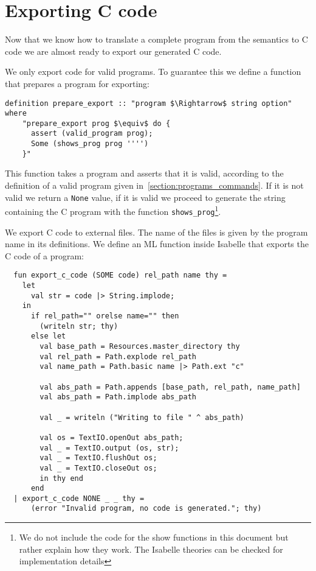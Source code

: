 \section{Exporting C code}\label{section:exporting_c_code}

Now that we know how to translate a complete program from the semantics to C code we are almost ready to export our generated C code.

We only export code for valid programs.
To guarantee this we define a function that prepares a program for exporting:

\begin{lstlisting}[mathescape=true]
  definition prepare_export :: "program $\Rightarrow$ string option" where
    "prepare_export prog $\equiv$ do {
      assert (valid_program prog);
      Some (shows_prog prog '''')
    }"
\end{lstlisting}


This function takes a program and asserts that it is valid, according to the definition of a valid program given in~\ref{section:programs_commands}.
If it is not valid we return a \verb|None| value, if it is valid we proceed to generate the string containing the C program with the function \verb|shows_prog|\footnote{We do not include the code for the show functions in this document but rather explain how they work. The Isabelle theories can be checked for implementation details}.

We export C code to external files.
The name of the files is given by the program name in its definitions.
We define an ML function inside Isabelle that exports the C code of a program:


\begin{lstlisting}
  fun export_c_code (SOME code) rel_path name thy =
    let
      val str = code |> String.implode;
    in
      if rel_path="" orelse name="" then
        (writeln str; thy)
      else let
        val base_path = Resources.master_directory thy
        val rel_path = Path.explode rel_path
        val name_path = Path.basic name |> Path.ext "c"

        val abs_path = Path.appends [base_path, rel_path, name_path]
        val abs_path = Path.implode abs_path

        val _ = writeln ("Writing to file " ^ abs_path)

        val os = TextIO.openOut abs_path;
        val _ = TextIO.output (os, str);
        val _ = TextIO.flushOut os;
        val _ = TextIO.closeOut os;
        in thy end
      end
  | export_c_code NONE _ _ thy =
      (error "Invalid program, no code is generated."; thy)
\end{lstlisting}

